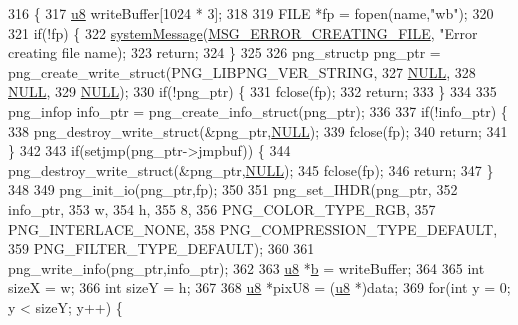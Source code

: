 \begin{DoxyCode}
316 \{
317   \mbox{\hyperlink{_system_8h_aed742c436da53c1080638ce6ef7d13de}{u8}} writeBuffer[1024 * 3];
318   
319   FILE *fp = fopen(name,\textcolor{stringliteral}{"wb"});
320 
321   \textcolor{keywordflow}{if}(!fp) \{
322     \mbox{\hyperlink{system_8cpp_a747a9cb8e015a3d45cca636b5bd0fc69}{systemMessage}}(\mbox{\hyperlink{_n_l_s_8h_a165f1f2539e202f0a24e6e9583c63475}{MSG\_ERROR\_CREATING\_FILE}}, \textcolor{stringliteral}{"Error creating file %
      name);
323     \textcolor{keywordflow}{return};
324   \}
325   
326   png\_structp png\_ptr = png\_create\_write\_struct(PNG\_LIBPNG\_VER\_STRING,
327                                                 \mbox{\hyperlink{getopt1_8c_a070d2ce7b6bb7e5c05602aa8c308d0c4}{NULL}},
328                                                 \mbox{\hyperlink{getopt1_8c_a070d2ce7b6bb7e5c05602aa8c308d0c4}{NULL}},
329                                                 \mbox{\hyperlink{getopt1_8c_a070d2ce7b6bb7e5c05602aa8c308d0c4}{NULL}});
330   \textcolor{keywordflow}{if}(!png\_ptr) \{
331     fclose(fp);
332     \textcolor{keywordflow}{return};
333   \}
334 
335   png\_infop info\_ptr = png\_create\_info\_struct(png\_ptr);
336 
337   \textcolor{keywordflow}{if}(!info\_ptr) \{
338     png\_destroy\_write\_struct(&png\_ptr,\mbox{\hyperlink{getopt1_8c_a070d2ce7b6bb7e5c05602aa8c308d0c4}{NULL}});
339     fclose(fp);
340     \textcolor{keywordflow}{return};
341   \}
342 
343   \textcolor{keywordflow}{if}(setjmp(png\_ptr->jmpbuf)) \{
344     png\_destroy\_write\_struct(&png\_ptr,\mbox{\hyperlink{getopt1_8c_a070d2ce7b6bb7e5c05602aa8c308d0c4}{NULL}});
345     fclose(fp);
346     \textcolor{keywordflow}{return};
347   \}
348 
349   png\_init\_io(png\_ptr,fp);
350 
351   png\_set\_IHDR(png\_ptr,
352                info\_ptr,
353                w,
354                h,
355                8,
356                PNG\_COLOR\_TYPE\_RGB,
357                PNG\_INTERLACE\_NONE,
358                PNG\_COMPRESSION\_TYPE\_DEFAULT,
359                PNG\_FILTER\_TYPE\_DEFAULT);
360 
361   png\_write\_info(png\_ptr,info\_ptr);
362 
363   \mbox{\hyperlink{_system_8h_aed742c436da53c1080638ce6ef7d13de}{u8}} *\mbox{\hyperlink{expr-lex_8cpp_a91b64995742fd30063314f12340b4b5a}{b}} = writeBuffer;
364 
365   \textcolor{keywordtype}{int} sizeX = w;
366   \textcolor{keywordtype}{int} sizeY = h;
367 
368   \mbox{\hyperlink{_system_8h_aed742c436da53c1080638ce6ef7d13de}{u8}} *pixU8 = (\mbox{\hyperlink{_system_8h_aed742c436da53c1080638ce6ef7d13de}{u8}} *)data;
369   \textcolor{keywordflow}{for}(\textcolor{keywordtype}{int} y = 0; y < sizeY; y++) \{
}
\end{DoxyCode}
